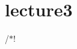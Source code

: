 \chapter{lecture3 }
\hypertarget{md_lecture-notes_2lecture3}{}\label{md_lecture-notes_2lecture3}
/\texorpdfstring{$\ast$}{*}! 